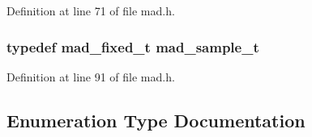 Definition at line 71 of file mad.\+h.

\subsubsection[{\texorpdfstring{mad\+\_\+sample\+\_\+t}{mad_sample_t}}]{\setlength{\rightskip}{0pt plus 5cm}typedef {\bf mad\+\_\+fixed\+\_\+t} {\bf mad\+\_\+sample\+\_\+t}}\hypertarget{lib-src_2libmad_2msvc_09_09_2mad_8h_a66d26474ecf238cb00458050afb95051}{}\label{lib-src_2libmad_2msvc_09_09_2mad_8h_a66d26474ecf238cb00458050afb95051}


Definition at line 91 of file mad.\+h.



\subsection{Enumeration Type Documentation}

